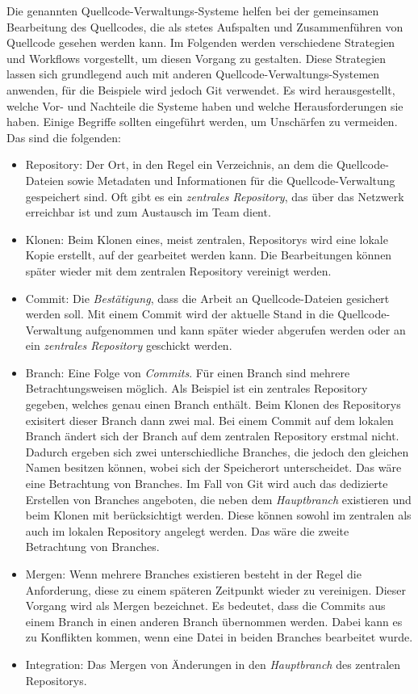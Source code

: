 Die genannten Quellcode-Verwaltungs-Systeme helfen bei der gemeinsamen Bearbeitung des Quellcodes, die als stetes Aufspalten und Zusammenführen von Quellcode gesehen werden kann. Im Folgenden werden verschiedene Strategien und Workflows vorgestellt, um diesen Vorgang zu gestalten. Diese Strategien lassen sich grundlegend auch mit anderen Quellcode-Verwaltungs-Systemen anwenden, für die Beispiele wird jedoch Git verwendet. Es wird herausgestellt, welche Vor- und Nachteile die Systeme haben und welche Herausforderungen sie haben.
Einige Begriffe sollten eingeführt werden, um Unschärfen zu vermeiden. Das sind die folgenden:
\begin{itemize}
\item
Repository: Der Ort, in den Regel ein Verzeichnis, an dem die Quellcode-Dateien sowie Metadaten und Informationen für die Quellcode-Verwaltung gespeichert sind. Oft gibt es ein \emph{zentrales Repository}, das über das Netzwerk erreichbar ist und zum Austausch im Team dient.
\item
Klonen: Beim Klonen eines, meist zentralen, Repositorys wird eine lokale Kopie erstellt, auf der gearbeitet werden kann. Die Bearbeitungen können später wieder mit dem zentralen Repository vereinigt werden.
\item
Commit: Die \emph{Bestätigung}, dass die Arbeit an Quellcode-Dateien gesichert werden soll. Mit einem Commit wird der aktuelle Stand in die Quellcode-Verwaltung aufgenommen und kann später wieder abgerufen werden oder an ein \emph{zentrales Repository} geschickt werden.
\item
Branch: Eine Folge von \emph{Commits}. Für einen Branch sind mehrere Betrachtungsweisen möglich. Als Beispiel ist ein zentrales Repository gegeben, welches genau einen Branch enthält. Beim Klonen des Repositorys exisitert dieser Branch dann zwei mal. Bei einem Commit auf dem lokalen Branch ändert sich der Branch auf dem zentralen Repository erstmal nicht. Dadurch ergeben sich zwei unterschiedliche Branches, die jedoch den gleichen Namen besitzen können, wobei sich der Speicherort unterscheidet. Das wäre eine Betrachtung von Branches. Im Fall von Git wird auch das dedizierte Erstellen von Branches angeboten, die neben dem \emph{Hauptbranch} existieren und beim Klonen mit berücksichtigt werden. Diese können sowohl im zentralen als auch im lokalen Repository angelegt werden. Das wäre die zweite Betrachtung von Branches.
\item
Mergen:
Wenn mehrere Branches existieren besteht in der Regel die Anforderung, diese zu einem späteren Zeitpunkt wieder zu vereinigen. Dieser Vorgang wird als Mergen bezeichnet. Es bedeutet, dass die Commits aus einem Branch in einen anderen Branch übernommen werden. Dabei kann es zu Konflikten kommen, wenn eine Datei in beiden Branches bearbeitet wurde.
\item
Integration: Das Mergen von Änderungen in den \emph{Hauptbranch} des zentralen Repositorys.
\end{itemize}

